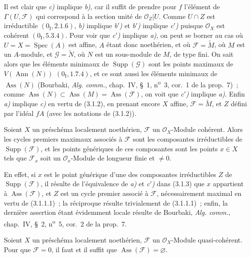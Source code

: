 Il est clair que \emph{c)} implique \emph{b)}, car il suffit de prendre pour
$f$ l'élément de $\Gamma(U,\mathcal F)$ qui correspond à la section unité de
$\mathcal O_Z|U$. Comme $U\cap Z$ est irréductible $(0_{\mathrm I},2.1.6)$,
\emph{b)} implique \emph{b$'$)} et \emph{b$'$)} implique \emph{c$'$)} puisque
$\mathcal O_X$ est cohérent $(0_{\mathrm I},5.3.4)$. Pour voir que
\emph{c$'$)} implique \emph{a)}, on peut se borner au cas où
$U=X=\operatorname{Spec}(A)$ est affine, $A$ étant donc noethérien, et où
$\mathcal F=\widetilde M$, où $M$ est un $A$-module, et
$\mathcal G=\widetilde N$, où $N$ est un sous-module de $M$, de type fini.
On sait alors que les éléments minimaux de $\operatorname{Supp}(\mathcal G)$
sont les points maximaux de $V(\operatorname{Ann}(N))$ $(0_{\mathrm I},1.7.4)$,
et ce sont aussi les éléments minimaux de $\operatorname{Ass}(N)$ (Bourbaki,
\emph{Alg. comm.}, chap.~IV, \S~1, n\textsuperscript{o}~3, cor.~1 de la
prop.~7)~; comme $\operatorname{Ass}(N)\subset\operatorname{Ass}(M)
=\operatorname{Ass}(\mathcal F)$, on voit que \emph{c$'$)} implique
\emph{a)}. Enfin \emph{a)} implique \emph{c)} en vertu de (3.1.2), en
prenant encore $X$ affine, $\mathcal F=\widetilde M$, et $Z$ défini par
l'idéal $fA$ (avec les notations de (3.1.2)).

\begin{corollary}[3.1.4]
\label{IV.2.3.1.4-fr}
Soient $X$ un préschéma localement noethérien, $\mathcal F$ un
$\mathcal O_X$-Module cohérent. Alors les cycles premiers maximaux associés à
$\mathcal F$ sont les composantes irréductibles de
$\operatorname{Supp}(\mathcal F)$, et les points génériques de ces composantes
sont les points $x\in X$ tels que $\mathcal F_x$ soit un
$\mathcal O_x$-Module de longueur finie et $\ne0$.
\end{corollary}

En effet, si $x$ est le point générique d'une des composantes irréductibles
$Z$ de $\operatorname{Supp}(\mathcal F)$, il résulte de l'équivalence de
\emph{a)} et \emph{c$'$)} dans (3.1.3) que $x$ appartient à
$\operatorname{Ass}(\mathcal F)$, et $Z$ est un cycle premier associé à
$\mathcal F$, nécessairement maximal en vertu de (3.1.1.1)~; la réciproque
résulte trivialement de (3.1.1.1)~; enfin, la dernière assertion étant
évidemment locale résulte de Bourbaki, \emph{Alg. comm.}, chap.~IV, \S~2,
n\textsuperscript{o}~5, cor.~2 de la prop.~7.

\begin{corollary}[3.1.5]
\label{IV.2.3.1.5-fr}
Soient $X$ un préschéma localement noethérien, $\mathcal F$ un
$\mathcal O_X$-Module quasi-cohérent. Pour que $\mathcal F=0$, il faut et il
suffit que $\operatorname{Ass}(\mathcal F)=\varnothing$.
\end{corollary}

